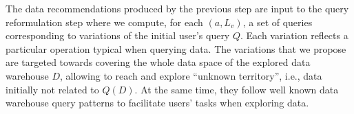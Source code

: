 % 
%
%  
  
   
  The data recommendations produced by the previous step are input to the query reformulation step where we compute, for each $(a, L_v)$, a set of queries corresponding to variations of the initial user's query $Q$. 
Each variation reflects a particular operation typical when querying data. 
The variations that we propose are targeted towards covering the whole data space of the explored data warehouse $D$, allowing to reach and explore ``unknown territory'', i.e., data initially not related to $Q(D)$. 
At the same time, they follow well known data warehouse query patterns to facilitate users' tasks when exploring data.


